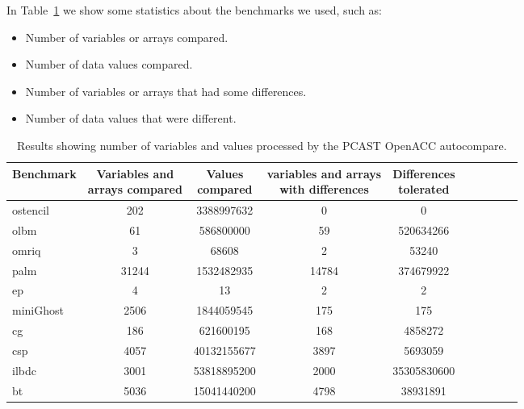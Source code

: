 In Table~\ref{res2} 
we show some statistics about the benchmarks we used, such as:
\begin{itemize}
\item Number of variables or arrays compared.
\item Number of data values compared.
\item Number of variables or arrays that had some differences.
\item Number of data values that were different.
\end{itemize}

\begin{table}
\begin{center}
\begin{tabular}{|l|c|c|c|c|c|c|c|c|c|}
\hline
Benchmark &  \parbox[c]{3 cm}{\centering Variables and \\ arrays compared} &  \parbox[c]{2 cm}{\centering Values \\ compared} &  \parbox[c]{3 cm}{\centering variables and arrays \\     with differences} & \parbox[c]{2 cm}{\centering Differences \\      tolerated}\\
\hline
\hline

ostencil  & 202 & 3388997632 & 0 & 0\\
\hline
olbm      & 61 & 586800000 & 59 & 520634266\\
\hline
omriq     & 3 & 68608 & 2 & 53240 \\
\hline
palm      & 31244 & 1532482935 & 14784 & 374679922\\
\hline
ep        & 4 & 13 & 2 & 2 \\
\hline
miniGhost & 2506 & 1844059545 & 175 & 175\\
\hline
cg        & 186 & 621600195 & 168 & 4858272\\
\hline
csp       & 4057 & 40132155677	& 3897 & 5693059\\
\hline
ilbdc     & 3001 & 53818895200 & 2000 & 35305830600 \\
\hline
bt        & 5036 & 15041440200 & 4798 & 38931891 \\
\hline
\end{tabular}
\end{center}
\caption{Results showing number of variables and values processed by the PCAST OpenACC autocompare.}
\label{res2}
\end{table}



